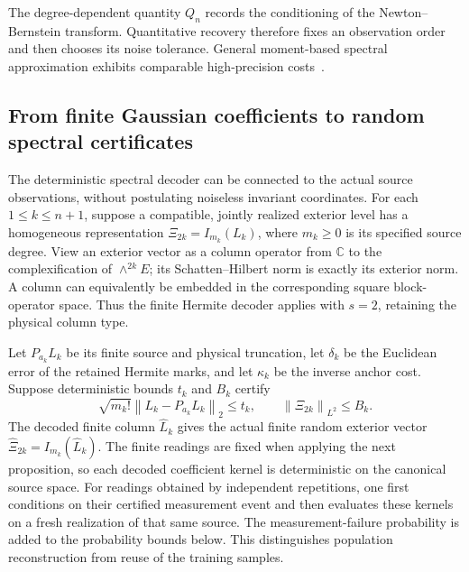 \documentclass[11pt,a4paper]{amsart}
\numberwithin{equation}{section}
\theoremstyle{definition}
\theoremstyle{remark}
\newcommand{\C}{\mathbb C}
\newcommand{\norm}[1]{\left\lVert#1\right\rVert}
\begin{document}
The degree-dependent quantity $Q_n$ records the conditioning of the Newton--Bernstein transform. Quantitative recovery therefore fixes an observation order and then chooses its noise tolerance. General moment-based spectral approximation exhibits comparable high-precision costs~\cite{JinEtAl}.

\subsection{From finite Gaussian coefficients to random spectral certificates}
The deterministic spectral decoder can be connected to the actual source observations, without postulating noiseless invariant coordinates. For each $1\le k\le n+1$, suppose a compatible, jointly realized exterior level has a homogeneous representation
$\Xi_{2k}=I_{m_k}(L_k)$, where $m_k\ge0$ is its specified source degree. View an exterior vector as a column operator from $\C$ to the complexification of $\wedge^{2k}E$; its Schatten--Hilbert norm is exactly its exterior norm. A column can equivalently be embedded in the corresponding square block-operator space. Thus the finite Hermite decoder applies with $s=2$, retaining the physical column type.

Let $P_{a_k}L_k$ be its finite source and physical truncation, let $\delta_k$ be the Euclidean error of the retained Hermite marks, and let $\kappa_k$ be the inverse anchor cost. Suppose deterministic bounds $t_k$ and $B_k$ certify
\[
 \sqrt{m_k!}\norm{L_k-P_{a_k}L_k}_2\le t_k,
 \qquad \norm{\Xi_{2k}}_{L^2}\le B_k.
\]
The decoded finite column $\widehat L_k$ gives the actual finite random exterior vector $\widehat\Xi_{2k}=I_{m_k}(\widehat L_k)$.
The finite readings are fixed when applying the next proposition, so each decoded coefficient kernel is deterministic on the canonical source space. For readings obtained by independent repetitions, one first conditions on their certified measurement event and then evaluates these kernels on a fresh realization of that same source. The measurement-failure probability is added to the probability bounds below. This distinguishes population reconstruction from reuse of the training samples.
\end{document}
